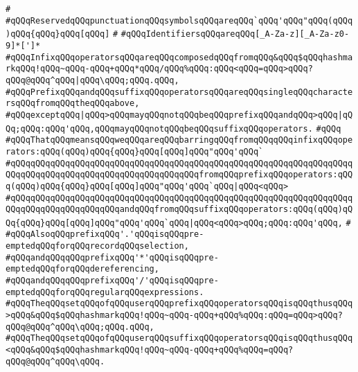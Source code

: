\verb|#|\newline
\verb|#qQQqReservedqQQqpunctuationqQQqsymbolsqQQqareqQQq`qQQq'qQQq"qQQq(qQQq)qQQq{qQQq}qQQq[qQQq]|\newline
\verb|#|\newline
\verb|#qQQqIdentifiersqQQqareqQQq[_A-Za-z][_A-Za-z0-9]*[']*|\newline
\verb|#qQQqInfixqQQqoperatorsqQQqareqQQqcomposedqQQqfromqQQq&qQQq$qQQqhashmarkqQQq!qQQq~qQQq-qQQq+qQQq*qQQq/qQQq%qQQq:qQQq<qQQq=qQQq>qQQq?qQQq@qQQq^qQQq|\verb#|qQQq\qQQq;qQQq.qQQq,#\newline
\verb|#qQQqPrefixqQQqandqQQqsuffixqQQqoperatorsqQQqareqQQqsingleqQQqcharactersqQQqfromqQQqtheqQQqabove,|\newline
\verb|#qQQqexceptqQQq|\verb#|qQQq>qQQqmayqQQqnotqQQqbeqQQqprefixqQQqandqQQq>qQQq|qQQq;qQQq:qQQq'qQQq,qQQqmayqQQqnotqQQqbeqQQqsuffixqQQqoperators.#\newline
\verb|#qQQq|\newline
\verb|#qQQqThatqQQqmeansqQQqweqQQqareqQQqbarringqQQqfromqQQqqQQqinfixqQQqoperators:qQQq(qQQq)qQQq{qQQq}qQQq[qQQq]qQQq"qQQq'qQQq`|\newline
\verb|#qQQqqQQqqQQqqQQqqQQqqQQqqQQqqQQqqQQqqQQqqQQqqQQqqQQqqQQqqQQqqQQqqQQqqQQqqQQqqQQqqQQqqQQqqQQqqQQqqQQqqQQqqQQqfromqQQqprefixqQQqoperators:qQQq(qQQq)qQQq{qQQq}qQQq[qQQq]qQQq"qQQq'qQQq`qQQq|\verb#|qQQq<qQQq>#\newline
\verb|#qQQqqQQqqQQqqQQqqQQqqQQqqQQqqQQqqQQqqQQqqQQqqQQqqQQqqQQqqQQqqQQqqQQqqQQqqQQqqQQqqQQqqQQqqQQqandqQQqfromqQQqsuffixqQQqoperators:qQQq(qQQq)qQQq{qQQq}qQQq[qQQq]qQQq"qQQq'qQQq`qQQq|\verb#|qQQq<qQQq>qQQq;qQQq:qQQq'qQQq,#\newline
\verb|#|\newline
\verb|#qQQqAlsoqQQqprefixqQQq'.'qQQqisqQQqpre-emptedqQQqforqQQqrecordqQQqselection,|\newline
\verb|#qQQqandqQQqqQQqprefixqQQq'*'qQQqisqQQqpre-emptedqQQqforqQQqdereferencing,|\newline
\verb|#qQQqandqQQqqQQqprefixqQQq'/'qQQqisqQQqpre-emptedqQQqforqQQqregularqQQqexpressions.|\newline
\verb|#qQQqTheqQQqsetqQQqofqQQquserqQQqprefixqQQqoperatorsqQQqisqQQqthusqQQq>qQQq&qQQq$qQQqhashmarkqQQq!qQQq~qQQq-qQQq+qQQq%qQQq:qQQq=qQQq>qQQq?qQQq@qQQq^qQQq\qQQq;qQQq.qQQq,|\newline
\verb|#qQQqTheqQQqsetqQQqofqQQquserqQQqsuffixqQQqoperatorsqQQqisqQQqthusqQQq<qQQq&qQQq$qQQqhashmarkqQQq!qQQq~qQQq-qQQq+qQQq%qQQq=qQQq?qQQq@qQQq^qQQq\qQQq.|\newline
